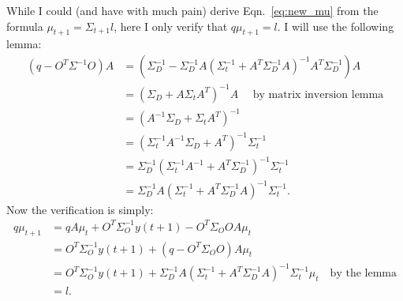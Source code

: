\documentclass[12pt]{article}
\newcommand{\ti}[2]{{#1}{(#2)}}                         %
\begin{document}
While I could (and have with much pain) derive Eqn.~\eqref{eq:new_mu}
from the formula $\mu_{t+1} = \Sigma_{t+1} l$, here I only verify that
$q \mu_{t+1} = l$.  I will use the following lemma:
\begin{align*}
  (q-O^T\Sigma^{-1}O)A &= \left( \Sigma_D^{-1} - \Sigma_D^{-1} A (
    \Sigma_t^{-1} + A^T \Sigma_D^{-1} A)^{-1} A^T \Sigma_D^{-1}
  \right) A \\
  &= (\Sigma_D + A \Sigma_t A^T)^{-1} A \quad \text{ by matrix inversion
    lemma} \\
  &= (A^{-1} \Sigma_D + \Sigma_t A^T)^{-1} \\
  &= (\Sigma_t^{-1} A^{-1} \Sigma_D + A^T)^{-1} \Sigma_t^{-1}\\
  &= \Sigma_D^{-1} (\Sigma_t^{-1} A^{-1}  + A^T\Sigma_D^{-1})^{-1} \Sigma_t^{-1}\\
  &= \Sigma_D^{-1} A (\Sigma_t^{-1}  + A^T\Sigma_D^{-1} A)^{-1} \Sigma_t^{-1}.
\end{align*}
Now the verification is simply:
\begin{align*}
  q \mu_{t+1} &= qA\mu_t + O^T \Sigma_O^{-1} \ti{y}{t+1} - O^T
  \Sigma_O O A \mu_t \\
  &= O^T \Sigma_O^{-1} \ti{y}{t+1} + (q - O^T \Sigma_O O) A \mu_t \\
  &= O^T\Sigma_O^{-1}y(t+1) + \Sigma_D^{-1}A \left( \Sigma_t^{-1} +
    A^T \Sigma_D^{-1} A \right)^{-1} \Sigma_t^{-1} \mu_t \quad \text{
    by the lemma}\\
  &= l.
\end{align*}
\end{document}

